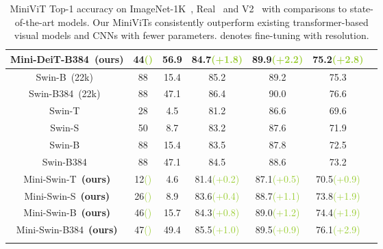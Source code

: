 \documentclass[10pt,twocolumn,letterpaper]{article}
\begin{document}
\begin{table}[t]
\begin{threeparttable}
{{\begin{tabular}{c|c|c|ccc|c}
        Mini-DeiT-B384~\textbf{(ours)} & 44{\textcolor{YellowGreen}{\scriptsize{()}}} & 56.9 & 84.7{\textcolor{YellowGreen}{\scriptsize{(+1.8)}}} & 89.9{\textcolor{YellowGreen}{\scriptsize{(+2.2)}}} & 75.2{\textcolor{YellowGreen}{\scriptsize{(+2.8)}}} &  \\
        \hline
        Swin-B~(22k)~\cite{Swin} & 88 & 15.4 & 85.2 & 89.2 & 75.3 &  \\
        Swin-B384~(22k)~\cite{Swin} & 88 & 47.1 & 86.4 & 90.0 & 76.6 &  \\
        \hline
        Swin-T~\cite{Swin} & 28 & 4.5 & 81.2 & 86.6 & 69.6 &  \\
        Swin-S~\cite{Swin} & 50 & 8.7 & 83.2 & 87.6 & 71.9 &  \\
        Swin-B~\cite{Swin} & 88 & 15.4 & 83.5 & 87.8 & 72.5 &  \\
        Swin-B384~\cite{Swin} & 88 & 47.1 & 84.5 & 88.6 & 73.2 &  \\
        \hline
        Mini-Swin-T~\textbf{(ours)} & 12{\textcolor{YellowGreen}{\scriptsize{()}}} & 4.6 & 81.4{\textcolor{YellowGreen}{\scriptsize{(+0.2)}}} & 87.1{\textcolor{YellowGreen}{\scriptsize{(+0.5)}}} & 70.5{\textcolor{YellowGreen}{\scriptsize{(+0.9)}}} &  \\
        Mini-Swin-S~\textbf{(ours)} & 26{\textcolor{YellowGreen}{\scriptsize{()}}} & 8.9 & 83.6{\textcolor{YellowGreen}{\scriptsize{(+0.4)}}} & 88.7{\textcolor{YellowGreen}{\scriptsize{(+1.1)}}} & 73.8{\textcolor{YellowGreen}{\scriptsize{(+1.9)}}} &  \\
        Mini-Swin-B~\textbf{(ours)} & 46{\textcolor{YellowGreen}{\scriptsize{()}}} & 15.7 & 84.3{\textcolor{YellowGreen}{\scriptsize{(+0.8)}}} & 89.0{\textcolor{YellowGreen}{\scriptsize{(+1.2)}}} & 74.4{\textcolor{YellowGreen}{\scriptsize{(+1.9)}}} & \\
        Mini-Swin-B384~\textbf{(ours)} & 47{\textcolor{YellowGreen}{\scriptsize{()}}} & 49.4 & 85.5{\textcolor{YellowGreen}{\scriptsize{(+1.0)}}} & 89.5{\textcolor{YellowGreen}{\scriptsize{(+0.9)}}} & 76.1{\textcolor{YellowGreen}{\scriptsize{(+2.9)}}} &  \\
        
        \Xhline{2\arrayrulewidth}
        \end{tabular}
    }}
        \end{threeparttable}
        \vspace{-0.3cm}
        \caption {
        MiniViT Top-1 accuracy on ImageNet-1K~\cite{imagenet}, Real~\cite{imagenet_real} and V2~\cite{imagenet_v2} with comparisons to state-of-the-art models. 
        Our MiniViTs consistently outperform existing transformer-based visual models and CNNs with fewer parameters.  denotes fine-tuning with  resolution.
        }
        \label {tab:sota_cls}
    \vspace{-6mm}
    \end{table}
    
\end{document}
